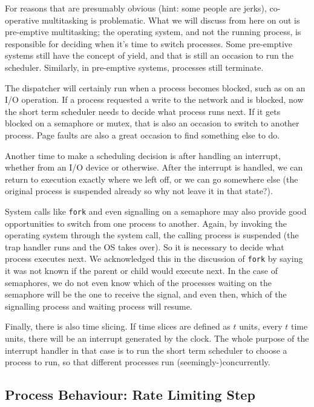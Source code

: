 For reasons that are presumably obvious (hint: some people are jerks), co-operative multitasking is problematic. What we will discuss from here on out is pre-emptive multitasking; the operating system, and not the running process, is responsible for deciding when it's time to switch processes. Some pre-emptive systems still have the concept of yield, and that is still an occasion to run the scheduler. Similarly, in pre-emptive systems, processes still terminate.

The dispatcher will certainly run when a process becomes blocked, such as on an I/O operation. If a process requested a write to the network and is blocked, now the short term scheduler needs to decide what process runs next. If it gets blocked on a semaphore or mutex, that is also an occasion to switch to another process. Page faults are also a great occasion to find something else to do.

Another time to make a scheduling decision is after handling an interrupt, whether from an I/O device or otherwise. After the interrupt is handled, we can return to execution exactly where we left off, or we can go somewhere else (the original process is suspended already so why not leave it in that state?). 

System calls like \texttt{fork} and even signalling on a semaphore may also provide good opportunities to switch from one process to another. Again, by invoking the operating system through the system call, the calling process is suspended (the trap handler runs and the OS takes over). So it is necessary to decide what process executes next. We acknowledged this in the discussion of \texttt{fork} by saying it was not known if the parent or child would execute next. In the case of semaphores, we do not even know which of the processes waiting on the semaphore will be the one to receive the signal, and even then, which of the signalling process and waiting process will resume.

Finally, there is also time slicing. If time slices are defined as $t$ units, every $t$ time units, there will be an interrupt generated by the clock. The whole purpose of the interrupt handler in that case is to run the short term scheduler to choose a process to run, so that different processes run (seemingly-)concurrently.

\subsection*{Process Behaviour: Rate Limiting Step}

